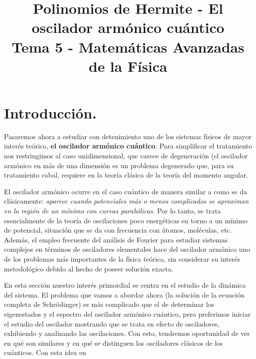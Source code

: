
\author{}
\title{Polinomios de Hermite - El oscilador armónico cuántico\\ {\large Tema 5 - Matemáticas Avanzadas de la Física}\vspace{-1.5\baselineskip}}
\date{ }

\maketitle
\fontsize{14}{14}\selectfont
\section{Introducción.}
Pasaremos ahora a estudiar con detenimiento uno de los sistemas físicos de
mayor interés teórico, \textbf{el oscilador armónico cuántico}. Para simplificar el tratamiento
nos restringimos al caso unidimensional, que carece de degeneración (el
oscilador armónico en más de una dimensión es un problema degenerado que,
para su tratamiento cabal, requiere en la teoría clásica de la teoría del momento
angular.
\par
El oscilador armónico ocurre en el caso cuántico de manera similar a como se da clásicamente:
\emph{aparece cuando potenciales más o menos complicados se aproximan en la región
de un mínimo con curvas parabólicas}. Por lo tanto, se trata esencialmente de la
teoría de oscilaciones poco energéticas en torno a un mínimo de potencial, situación
que se da con frecuencia con átomos, moléculas, etc. Además, el empleo frecuente
del análisis de Fourier para estudiar sistemas complejos en términos de osciladores
elementales hace del oscilador armónico uno de los problemas más importantes de
la física teórica, sin considerar su interés metodológico debido al hecho de poseer
solución exacta.
\par
En esta sección nuestro interés primordial se centra en el estudio de la dinámica
del sistema. El problema que vamos a abordar ahora (la solución de la ecuación
completa de Schrödinger) es más complicado que el de determinar los eigenestados
y el espectro del oscilador armónico cuántico, pero preferimos iniciar el estudio del
oscilador mostrando que se trata en efecto de osciladores, exhibiendo y analizando
las oscilaciones. Con esto, tendremos oportunidad de ver en qué son similares y
en qué se distinguen los osciladores clásicos de los cuánticos. Con esta idea en
